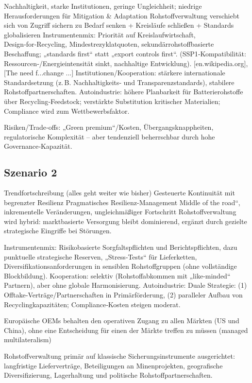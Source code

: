\documentclass[12pt,a4paper,oneside]{book} %
\begin{document}
Nachhaltigkeit, starke Institutionen, geringe Ungleichheit; niedrige Herausforderungen für Mitigation \& Adaptation
Rohstoffverwaltung verschiebt sich von Zugriff sichern zu Bedarf senken + Kreisläufe schließen + Standards globalisieren
Instrumentenmix: Priorität auf Kreislaufwirtschaft, Design‑for‑Recycling, Mindestrezyklatquoten, sekundärrohstoffbasierte Beschaffung; „standards first“ statt „export controls first“. (SSP1‑Kompatibilität: Ressourcen‑/Energieintensität sinkt, nachhaltige Entwicklung). [en.wikipedia.org], [The need f...change ...]
Institutionen/Kooperation: stärkere internationale Standardsetzung (z. B. Nachhaltigkeits‑ und Transparenzstandards), stabilere Rohstoffpartnerschaften.
Autoindustrie: höhere Planbarkeit für Batterierohstoffe über Recycling‑Feedstock; verstärkte Substitution kritischer Materialien; Compliance wird zum Wettbewerbsfaktor.

Risiken/Trade‑offs: „Green premium“/Kosten, Übergangsknappheiten, regulatorische Komplexität – aber tendenziell beherrschbar durch hohe Governance‑Kapazität.

\subsection{Szenario 2}
Trendfortschreibung (alles geht weiter wie bisher)
Gesteuerte Kontinuität mit begrenzter Resilienz
Pragmatisches Resilienz-Management
Middle of the road“, inkrementelle Veränderungen, ungleichmäßiger Fortschritt
Rohstoffverwaltung wird hybrid: marktbasierte Versorgung bleibt dominierend, ergänzt durch gezielte strategische Eingriffe bei Störungen.

Instrumentenmix: Risikobasierte Sorgfaltspflichten und Berichtspflichten, dazu punktuelle strategische Reserven, „Stress‑Tests“ für Lieferketten, Diversifikationsanforderungen in sensiblen Rohstoffgruppen (ohne vollständige Blockbildung).
Kooperation: selektiv (Rohstoffabkommen mit „like‑minded“ Partnern), aber ohne globale Harmonisierung.
Autoindustrie: Duale Strategie: (1) Offtake‑Verträge/Partnerschaften in Primärförderung, (2) paralleler Aufbau von Recyclingkapazitäten; Compliance‑Kosten steigen moderat.

Europäische OEMs behalten den operativen Zugang zu allen Märkten (US und China), ohne eine Entscheidung für einen der Märkte treffen zu müssen (managed multilateralism)

 Rohstoffverwaltung primär auf klassische Sicherungsinstrumente ausgerichtet: langfristige Lieferverträge, Beteiligungen an Minenprojekten, geografische Diversifizierung, Lagerhaltung und politische Rohstoffpartnerschaften.
\end{document}
